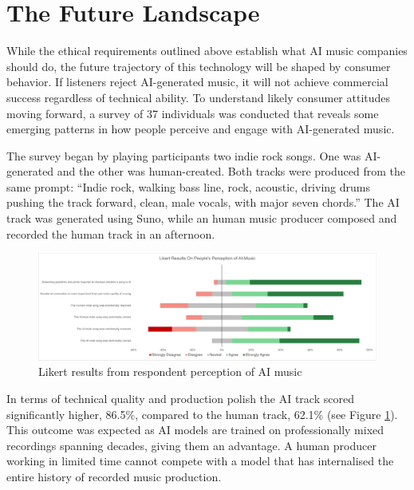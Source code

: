 \documentclass{article}
\begin{document}
\section{The Future Landscape}
While the ethical requirements outlined above establish what AI music companies should do, the future trajectory of this technology will be shaped by consumer behavior. If listeners reject AI-generated music, it will not achieve commercial success regardless of technical ability. To understand likely consumer attitudes moving forward,  a survey of 37 individuals was conducted that reveals some emerging patterns in how people perceive and engage with AI-generated music.

The survey began by playing participants two indie rock songs. One was AI-generated and the other was human-created. Both tracks were produced from the same prompt: ``Indie rock, walking bass line, rock, acoustic, driving drums pushing the track forward, clean, male vocals, with major seven chords.'' The AI track was generated using Suno, while an human music producer composed and recorded the human track in an afternoon. 

\begin{figure}[h]
    \centering
    \includegraphics[width=1\textwidth]{Likert Results.pdf}
    \caption{Likert results from respondent perception of AI music }
    \label{fig:likert results}
\end{figure}


In terms of technical quality and production polish the AI track scored significantly higher, 86.5\%, compared to the human track, 62.1\% (see Figure \ref{fig:likert results}). This outcome was expected as AI models are trained on professionally mixed recordings spanning decades, giving them an advantage. A human producer working in limited time cannot compete with a model that has internalised the entire history of recorded music production.
\end{document}
